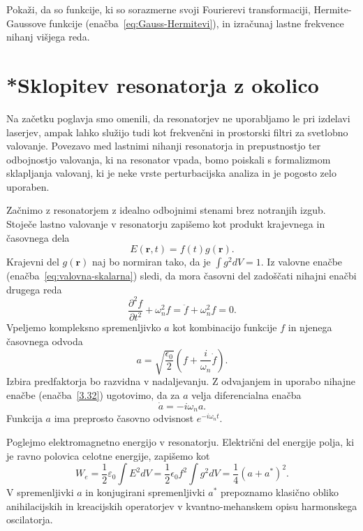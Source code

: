 \begin{definition}
Pokaži, da so funkcije, ki so sorazmerne svoji Fourierevi transformaciji, 
Hermite-Gaussove funkcije (enačba~\ref{eq:Gauss-Hermitevi}), 
in izračunaj lastne frekvence nihanj višjega reda.
\end{definition}

\section{*Sklopitev resonatorja z okolico}
Na začetku poglavja smo omenili, da resonatorjev ne uporabljamo le pri 
izdelavi laserjev, ampak lahko služijo tudi kot frekvenčni in
prostorski filtri za svetlobno valovanje. Povezavo med lastnimi nihanji
resonatorja in prepustnostjo ter odbojnostjo valovanja, ki na resonator
vpada, bomo poiskali s formalizmom sklapljanja valovanj, 
ki je neke vrste perturbacijska analiza in je pogosto zelo uporaben.

Začnimo z resonatorjem z idealno odbojnimi stenami brez notranjih izgub. Stoječe
lastno valovanje v resonatorju zapišemo kot produkt krajevnega in časovnega
dela
\begin{equation}
E(\mathbf{r},t)=f(t)g(\mathbf{r}).
\label{3.31}
\end{equation}
Krajevni del $g(\mathbf{r})$ naj bo normiran tako, da je $\int g^{2}dV=1$. Iz valovne
enačbe (enačba~\ref{eq:valovna-skalarna}) sledi, da mora časovni del zadoščati 
nihajni enačbi drugega reda
\begin{equation}
\frac{\partial^2 f}{\partial t^2}+\omega_{n}^{2}f= \ddot{f} + \omega_{n}^{2}f=0.
\label{3.32}
\end{equation}
Vpeljemo kompleksno spremenljivko $a$ kot kombinacijo funkcije $f$ in njenega
časovnega odvoda
\begin{equation}
a=\sqrt{\frac{\epsilon_{0}}{2}}(f+\frac{i}{\omega_{n}}\dot{f}).
\label{3.33}
\end{equation}
Izbira predfaktorja bo razvidna v nadaljevanju. 
Z odvajanjem in uporabo nihajne enačbe (enačba~\ref{3.32}) ugotovimo, da za $a$ velja 
diferencialna enačba 
\begin{equation}
\dot{a}=-i\omega_{n}a.
\label{3.34}
\end{equation}
Funkcija $a$ ima preprosto časovno odvisnost $e^{-i\omega_{n}t}$.\pagebreak

Poglejmo elektromagnetno energijo v resonatorju. Električni
del energije polja, ki je ravno polovica celotne energije, zapišemo kot
\begin{equation}
W_e = \frac{1}{2}\varepsilon_0 \int E^2 dV = \frac{1}{2}\epsilon_{0}f^{2}
\int g^{2}dV = \frac{1}{4} (a+a^{*})^2.
\end{equation}
V spremenljivki $a$ in konjugirani spremenljivki $a^{*}$ prepoznamo 
klasično obliko anihilacijskih in kreacijskih operatorjev v kvantno-mehanskem 
opisu harmonskega oscilatorja. 

